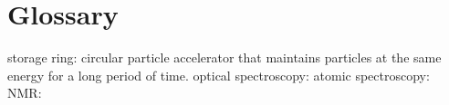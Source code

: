 \section{Glossary}
storage ring: circular particle accelerator that maintains particles at the same energy for a long period of time.
optical spectroscopy: 
atomic spectroscopy:
NMR:
